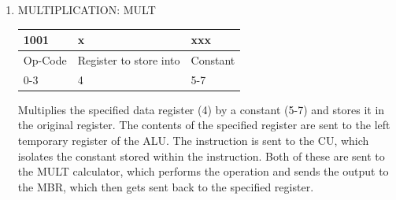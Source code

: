 \documentclass{article}
\begin{document}
\begin{enumerate}
\item MULTIPLICATION: MULT\\
  \begin{tabularx}{\textwidth}{|X|X|X|}
    \hline 1001 & x & xxx
    \\ \hline Op-Code & Register to store into & Constant
    \\ \hline 0-3 & 4 & 5-7
    \\ \hline
  \end{tabularx}
Multiplies the specified data register (4) by a constant (5-7) and stores it in the original register. The contents of the specified register are sent to the left temporary register of the ALU. The instruction is sent to the CU, which isolates the constant stored within the instruction. Both of these are sent to the MULT calculator, which performs the operation and sends the output to the MBR, which then gets sent back to the specified register.
  
\end{enumerate}
	
\end{document}
